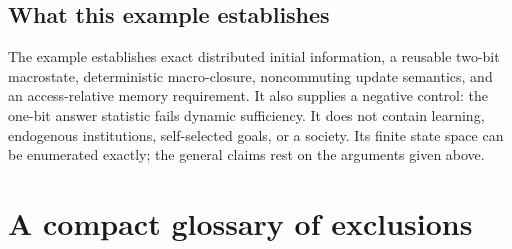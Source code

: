 \documentclass[11pt,letterpaper]{article}
\theoremstyle{plain}
\theoremstyle{definition}
\theoremstyle{remark}
\begin{document}
\subsection{What this example establishes}
The example establishes exact distributed initial information, a reusable two-bit macrostate, deterministic macro-closure, noncommuting update semantics, and an access-relative memory requirement. It also supplies a negative control: the one-bit answer statistic fails dynamic sufficiency. It does not contain learning, endogenous institutions, self-selected goals, or a society. Its finite state space can be enumerated exactly; the general claims rest on the arguments given above.

\section{A compact glossary of exclusions}\label{app:terms}
\end{document}
